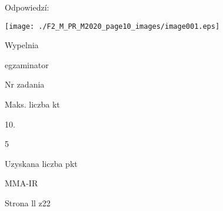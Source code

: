 \documentclass[a4paper,12pt]{article}
\begin{document}
Odpowiedzí:
\begin{center}
\texttt{[image: ./F2\_M\_PR\_M2020\_page10\_images/image001.eps]}
\end{center}
Wypelnia

egzaminator

Nr zadania

Maks. liczba kt

10.

5

Uzyskana liczba pkt

MMA-IR

Strona ll z22
\end{document}
